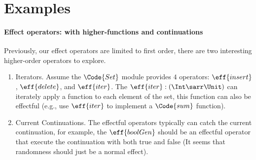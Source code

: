 \section{Examples}

\paragraph{Effect operators: with higher-functions and continuations} Previously, our effect operators are limited to first order, there are two interesting higher-order operators to explore.
\begin{enumerate}
    \item Iterators. Assume the $\Code{Set}$ module provides $4$ operators: $\eff{insert}$, $\eff{delete}$, and $\eff{iter}$. The $\eff{iter}: (\Int\sarr\Unit)$ can iterately apply a function to each element of the set, this function can also be effectful (e.g., use $\eff{iter}$ to implement a $\Code{sum}$ function).
    \item Current Continuations. The effectful operators typically can catch the current continuation, for example, the $\eff{boolGen}$ should be an effectful operator that execute the continuation with both true and false (It seems that randomness should just be a normal effect). 
\end{enumerate}


